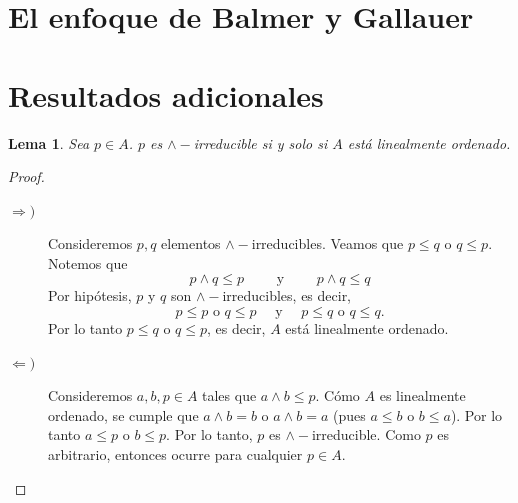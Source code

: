 \documentclass[11pt]{amsart}
\theoremstyle{plain}
\newtheorem{lem}[thm]{Lema}
\theoremstyle{definition}
\newtheorem{dfn}[thm]{Definición}
\begin{document}









\section{El enfoque de Balmer y Gallauer}
\cite{BalmerGallauer2025PatchDensity}

\section{Resultados adicionales}

\begin{lem}
    Sea $p\in A$. $p$ es $\wedge-$irreducible si y solo si $A$ está linealmente ordenado.
\end{lem}

\begin{proof}
\begin{description}
    \item[$\Rightarrow )$] Consideremos $p, q$ elementos $\wedge-$irreducibles. Veamos que $p\leq q$ o $q\leq p$. Notemos que 
    \[
    p\wedge q\leq p\qquad \mbox{ y }\qquad p\wedge q\leq q 
    \]
    Por hipótesis, $p$ y $q$ son $\wedge-$irreducibles, es decir, 
    \[
    p\leq p \mbox{ o }q\leq p\quad\mbox{ y }\quad p\leq q \mbox{ o }q\leq q.
    \]
    Por lo tanto $p\leq q$ o $q\leq p$, es decir, $A$ está linealmente ordenado.

    \item[$\Leftarrow )$] Consideremos $a,b, p\in A$ tales que $a\wedge b\leq p$. Cómo $A$ es linealmente ordenado, se cumple que $a\wedge b=b$ o $a\wedge b=a$ (pues $a\leq b$ o $b\leq a$). Por lo tanto $a\leq p$ o $b\leq p$. Por lo tanto, $p$ es $\wedge-$irreducible. Como $p$ es arbitrario, entonces ocurre para cualquier $p\in A$.
\end{description}
\end{proof}
\end{document}

